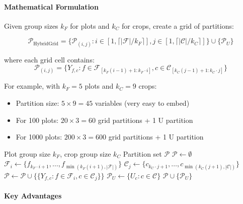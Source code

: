 \documentclass{oqireport}
\begin{document}
\paragraph{Mathematical Formulation}

Given group sizes $k_F$ for plots and $k_C$ for crops, create a grid of partitions:

\begin{equation}
\mathcal{P}_{\text{HybridGrid}} = \{\mathcal{P}_{(i,j)} : i \in [1, \lceil |\mathcal{F}|/k_F \rceil], j \in [1, \lceil |\mathcal{C}|/k_C \rceil]\} \cup \{\mathcal{P}_U\}
\end{equation}

where each grid cell contains:
\begin{equation}
\mathcal{P}_{(i,j)} = \{Y_{f,c} : f \in \mathcal{F}_{[k_F(i-1)+1:k_F \cdot i]}, c \in \mathcal{C}_{[k_C(j-1)+1:k_C \cdot j]}\}
\end{equation}

For example, with $k_F = 5$ plots and $k_C = 9$ crops:
\begin{itemize}
\item Partition size: $5 \times 9 = 45$ variables (very easy to embed)
\item For 100 plots: $20 \times 3 = 60$ grid partitions + 1 U partition
\item For 1000 plots: $200 \times 3 = 600$ grid partitions + 1 U partition
\end{itemize}

\begin{algorithm}
\caption{HybridGrid Decomposition}
\begin{algorithmic}[1]
\Require Plot group size $k_F$, crop group size $k_C$
\Ensure Partition set $\mathcal{P}$
\State $\mathcal{P} \leftarrow \emptyset$
    \State $\mathcal{F}_i \leftarrow \{f_{k_F \cdot i + 1}, \ldots, f_{\min(k_F(i+1), |\mathcal{F}|)}\}$
        \State $\mathcal{C}_j \leftarrow \{c_{k_C \cdot j + 1}, \ldots, c_{\min(k_C(j+1), |\mathcal{C}|)}\}$
        \State $\mathcal{P} \leftarrow \mathcal{P} \cup \{\{Y_{f,c} : f \in \mathcal{F}_i, c \in \mathcal{C}_j\}\}$
    \EndFor
\EndFor
\State $\mathcal{P}_U \leftarrow \{U_c : c \in \mathcal{C}\}$
\State \Return $\mathcal{P} \cup \{\mathcal{P}_U\}$
\end{algorithmic}
\end{algorithm}

\paragraph{Key Advantages}
\end{document}
